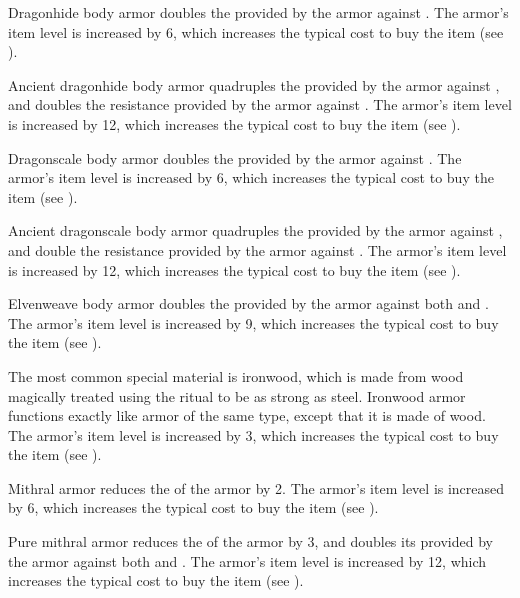          Dragonhide body armor doubles the  provided by the armor against .
        The armor's item level is increased by 6, which increases the typical cost to buy the item (see ).

         Ancient dragonhide body armor quadruples the  provided by the armor against , and doubles the resistance provided by the armor against .
        The armor's item level is increased by 12, which increases the typical cost to buy the item (see ).

         Dragonscale body armor doubles the  provided by the armor against .
        The armor's item level is increased by 6, which increases the typical cost to buy the item (see ).

         Ancient dragonscale body armor quadruples the  provided by the armor against , and double the resistance provided by the armor against .
        The armor's item level is increased by 12, which increases the typical cost to buy the item (see ).

         Elvenweave body armor doubles the  provided by the armor against both  and .
        The armor's item level is increased by 9, which increases the typical cost to buy the item (see ).

         The most common special material is ironwood, which is made from wood magically treated using the  ritual to be as strong as steel. Ironwood armor functions exactly like  armor of the same type, except that it is made of wood.
        The armor's item level is increased by 3, which increases the typical cost to buy the item (see ).

         Mithral armor reduces the  of the armor by 2.
        The armor's item level is increased by 6, which increases the typical cost to buy the item (see ).

         Pure mithral armor reduces the  of the armor by 3, and doubles its  provided by the armor against both  and .
        The armor's item level is increased by 12, which increases the typical cost to buy the item (see ).

